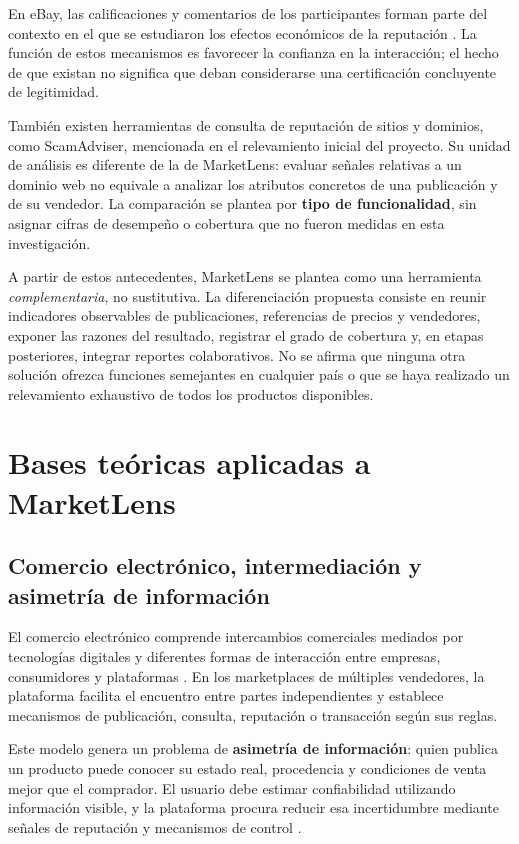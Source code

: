 En eBay, las calificaciones y comentarios de los participantes forman parte del contexto en el que se estudiaron los efectos económicos de la reputación \parencite{ml-resnick-2006,ml-tadelis-2016}. La función de estos mecanismos es favorecer la confianza en la interacción; el hecho de que existan no significa que deban considerarse una certificación concluyente de legitimidad.

También existen herramientas de consulta de reputación de sitios y dominios, como ScamAdviser, mencionada en el relevamiento inicial del proyecto. Su unidad de análisis es diferente de la de MarketLens: evaluar señales relativas a un dominio web no equivale a analizar los atributos concretos de una publicación y de su vendedor. La comparación se plantea por \textbf{tipo de funcionalidad}, sin asignar cifras de desempeño o cobertura que no fueron medidas en esta investigación.

A partir de estos antecedentes, MarketLens se plantea como una herramienta \emph{complementaria}, no sustitutiva. La diferenciación propuesta consiste en reunir indicadores observables de publicaciones, referencias de precios y vendedores, exponer las razones del resultado, registrar el grado de cobertura y, en etapas posteriores, integrar reportes colaborativos. No se afirma que ninguna otra solución ofrezca funciones semejantes en cualquier país o que se haya realizado un relevamiento exhaustivo de todos los productos disponibles.

\section{Bases teóricas aplicadas a MarketLens}\label{sec:ml-bases-teoricas}

\subsection{Comercio electrónico, intermediación y asimetría de información}\label{subsec:ml-comercio-electronico}

El comercio electrónico comprende intercambios comerciales mediados por tecnologías digitales y diferentes formas de interacción entre empresas, consumidores y plataformas \parencite{ml-laudon-traver-2024}. En los marketplaces de múltiples vendedores, la plataforma facilita el encuentro entre partes independientes y establece mecanismos de publicación, consulta, reputación o transacción según sus reglas.

Este modelo genera un problema de \textbf{asimetría de información}: quien publica un producto puede conocer su estado real, procedencia y condiciones de venta mejor que el comprador. El usuario debe estimar confiabilidad utilizando información visible, y la plataforma procura reducir esa incertidumbre mediante señales de reputación y mecanismos de control \parencite{ml-tadelis-2016}.

